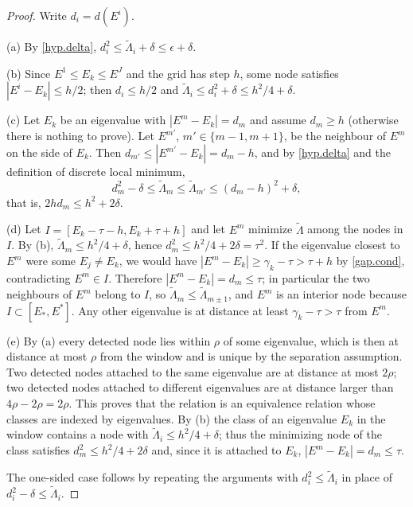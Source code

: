 \begin{proof}
Write $d_i=d(E^i)$.

(a) By \eqref{hyp.delta}, $d_i^2\le\tilde\Lambda_i+\delta\le\epsilon+\delta$.

(b) Since $E^1\le E_k\le E^J$ and the grid has step $h$, some node satisfies
$|E^i-E_k|\le h/2$; then $d_i\le h/2$ and
$\tilde\Lambda_i\le d_i^2+\delta\le h^2/4+\delta$.

(c) Let $E_k$ be an eigenvalue with $|E^m-E_k|=d_m$ and assume $d_m\ge h$ (otherwise
there is nothing to prove). Let $E^{m'}$, $m'\in\{m-1,m+1\}$, be the neighbour of $E^m$
on the side of $E_k$. Then $d_{m'}\le|E^{m'}-E_k|=d_m-h$, and by \eqref{hyp.delta} and
the definition of discrete local minimum,
\[
d_m^2-\delta\le\tilde\Lambda_m\le\tilde\Lambda_{m'}\le(d_m-h)^2+\delta ,
\]
that is, $2hd_m\le h^2+2\delta$.

(d) Let $I=[E_k-\tau-h,E_k+\tau+h]$ and let $E^m$ minimize $\tilde\Lambda$ among the nodes
in $I$. By (b), $\tilde\Lambda_m\le h^2/4+\delta$, hence $d_m^2\le h^2/4+2\delta=\tau^2$.
If the eigenvalue closest to $E^m$ were some $E_j\neq E_k$, we would have
$|E^m-E_k|\ge\gamma_k-\tau>\tau+h$ by \eqref{gap.cond}, contradicting $E^m\in I$.
Therefore $|E^m-E_k|=d_m\le\tau$; in particular the two neighbours of $E^m$ belong to
$I$, so $\tilde\Lambda_m\le\tilde\Lambda_{m\pm1}$, and $E^m$ is an interior node because
$I\subset[E_*,E^*]$. Any other eigenvalue is at distance at least
$\gamma_k-\tau>\tau$ from $E^m$.

(e) By (a) every detected node lies within $\rho$ of some eigenvalue, which is then at
distance at most $\rho$ from the window and is unique by the separation assumption. Two
detected nodes attached to the same eigenvalue are at distance at most $2\rho$; two
detected nodes attached to different eigenvalues are at distance larger than
$4\rho-2\rho=2\rho$. This proves that the relation is an equivalence relation whose
classes are indexed by eigenvalues. By (b) the class of an eigenvalue $E_k$ in the window
contains a node with $\tilde\Lambda_i\le h^2/4+\delta$; thus the minimizing node of the
class satisfies $d_m^2\le h^2/4+2\delta$ and, since it is attached to $E_k$,
$|E^m-E_k|=d_m\le\tau$.

The one-sided case follows by repeating the arguments with $d_i^2\le\tilde\Lambda_i$ in
place of $d_i^2-\delta\le\tilde\Lambda_i$.
\end{proof}

